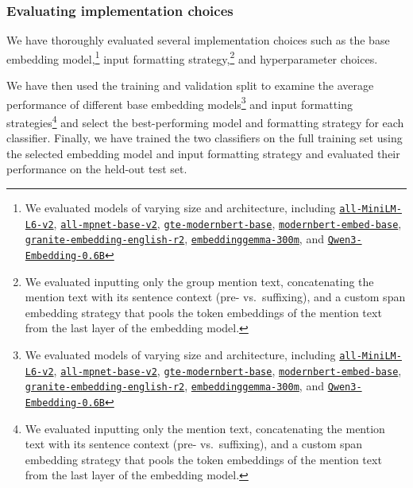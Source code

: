 \documentclass[12pt]{article}
\begin{document}
\subsubsection{Evaluating implementation choices}\label{evaluating-implementation-choices}

We have thoroughly evaluated several implementation choices such as the base embedding model,\footnote{We evaluated models of varying size and architecture, including
  \href{https://huggingface.co/sentence-transformers/all-MiniLM-L6-v2}{\texttt{all-MiniLM-L6-v2}},
  \href{https://huggingface.co/sentence-transformers/all-mpnet-base-v2}{\texttt{all-mpnet-base-v2}},
  \href{https://huggingface.co/Alibaba-NLP/gte-modernbert-base}{\texttt{gte-modernbert-base}},
  \href{https://huggingface.co/nomic-ai/modernbert-embed-base}{\texttt{modernbert-embed-base}},
  \href{https://huggingface.co/ibm-granite/granite-embedding-english-r2}{\texttt{granite-embedding-english-r2}},
  \href{https://huggingface.co/google/embeddinggemma-300m}{\texttt{embeddinggemma-300m}},
  and
  \href{https://huggingface.co/Qwen/Qwen3-Embedding-0.6B}{\texttt{Qwen3-Embedding-0.6B}}} input formatting strategy,\footnote{We evaluated inputting only the group mention text, concatenating the mention text with its sentence context (pre- vs.~suffixing), and a custom span embedding strategy that pools the token embeddings of the mention text from the last layer of the embedding model.} and hyperparameter choices.

We have then used the training and validation split to examine the average performance of different base embedding models\footnote{We evaluated models of varying size and architecture, including
  \href{https://huggingface.co/sentence-transformers/all-MiniLM-L6-v2}{\texttt{all-MiniLM-L6-v2}},
  \href{https://huggingface.co/sentence-transformers/all-mpnet-base-v2}{\texttt{all-mpnet-base-v2}},
  \href{https://huggingface.co/Alibaba-NLP/gte-modernbert-base}{\texttt{gte-modernbert-base}},
  \href{https://huggingface.co/nomic-ai/modernbert-embed-base}{\texttt{modernbert-embed-base}},
  \href{https://huggingface.co/ibm-granite/granite-embedding-english-r2}{\texttt{granite-embedding-english-r2}},
  \href{https://huggingface.co/google/embeddinggemma-300m}{\texttt{embeddinggemma-300m}},
  and
  \href{https://huggingface.co/Qwen/Qwen3-Embedding-0.6B}{\texttt{Qwen3-Embedding-0.6B}}} and input formatting strategies\footnote{We evaluated inputting only the mention text, concatenating the mention text with its sentence context (pre- vs.~suffixing), and a custom span embedding strategy that pools the token embeddings of the mention text from the last layer of the embedding model.} and select the best-performing model and formatting strategy for each classifier.
Finally, we have trained the two classifiers on the full training set using the selected embedding model and input formatting strategy and evaluated their performance on the held-out test set.
\end{document}

